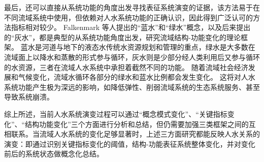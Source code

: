 最后，还可以直接从系统功能的角度出发寻找表征系统演变的证据，该方法易于在不同流域系统中使用，但依赖对人水系统功能的正确认识，因此得到广泛认可的方法指标相对较少。
Falkenmark 等人提出的“蓝水”和“绿水”概念\cite{falkenmark2006}，以及后来提出的“灰水”，都是典型的从系统功能角度出发，研究流域结构-功能变化的理论框架\cite{mekonnen2011}。
蓝水是河道与地下的液态水传统水资源规划和管理的重点，绿水是大多数在流域面上以降水和蒸散的形式参与循环，灰水则是少部分经人类利用后又参与循环的水资源，三者在流域人水系统中承担着截然不同的功能\cite{craswell2007}。
随着流域社会经济发展和气候变化，流域水循环各部分的绿水和蓝水比例都会发生变化。
这将对人水系统功能产生极为深远的影响，如降低弹性、削弱流域系统的生态系统服务、甚至导致系统崩溃\cite{falkenmark2019}。

综上所述，当前人水系统演变过程可以通过“概念模式变化”、“关键指标变化”、“结构功能变化”三个方面进行分析和总结，但仍需要加强三类框架之间的互相联系。当流域人水系统的变化足够显著时，上述三方面研究都能反映人\textendash{}水关系的演变：即通过识别关键指标变化的阈值，结构-功能表征系统整体变化，并对变化前后的系统状态做概念化总结。
